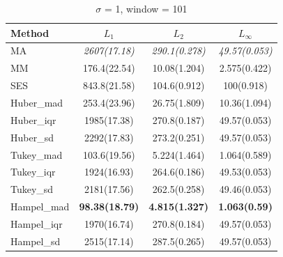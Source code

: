 \documentclass[letterpaper,12pt]{article}
\begin{document}
{%
\begin{table}[H]
\small
\centering
\caption{$\sigma$ = 1, window = 101}
\vspace{-2mm}
\label{tab:s1w101}
\begin{tabular}{lccc}
\toprule
Method      & $L_1$             & $L_2$             & $L_\infty$       \\
\midrule
MA           & \textit{2607(17.18)}  & \textit{290.1(0.278)} & \textit{49.57(0.053)}   \\
MM           & 176.4(22.54)      & 10.08(1.204)      & 2.575(0.422)     \\
SES          & 843.8(21.58)      & 104.6(0.912)      & 100(0.918)       \\
Huber\_mad   & 253.4(23.96)      & 26.75(1.809)      & 10.36(1.094)     \\
Huber\_iqr   & 1985(17.38)       & 270.8(0.187)      & 49.57(0.053)     \\
Huber\_sd    & 2292(17.83)       & 273.2(0.251)      & 49.57(0.053)     \\
Tukey\_mad   & 103.6(19.56)      & 5.224(1.464)      & 1.064(0.589)     \\
Tukey\_iqr   & 1924(16.93)       & 264.6(0.186)      & 49.53(0.053)     \\
Tukey\_sd    & 2181(17.56)       & 262.5(0.258)      & 49.46(0.053)     \\
Hampel\_mad  & \textbf{98.38(18.79)}  & \textbf{4.815(1.327)}  & \textbf{1.063(0.59)}    \\
Hampel\_iqr  & 1970(16.74)       & 270.8(0.184)      & 49.57(0.053)     \\
Hampel\_sd   & 2515(17.14)       & 287.5(0.265)      & 49.57(0.053)     \\
\bottomrule
\end{tabular}
\end{table}

}
\end{document}
